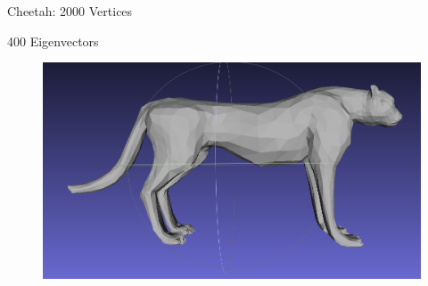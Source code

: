 \documentclass{beamer}
\begin{document}
\begin{frame}{Cheetah: 2000 Vertices}

400 Eigenvectors
\begin{figure}[t]
    \includegraphics[width=\textwidth]{Harmonics/CheetahProjections/CheetahProj400.png}
\end{figure}

\end{frame}
\end{document}
